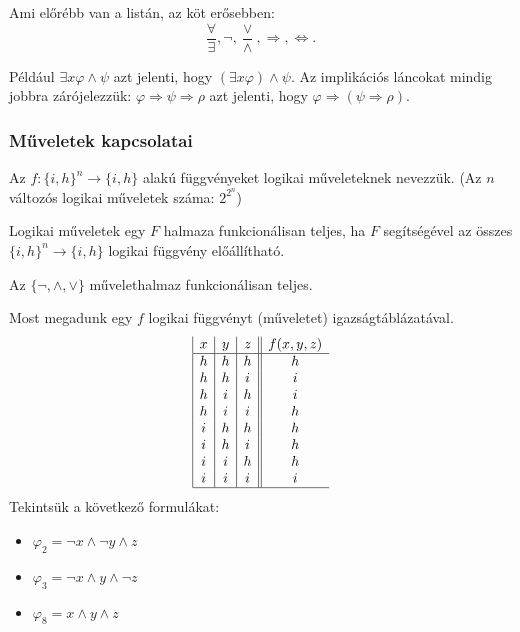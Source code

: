 \begin{defi}[Elősorrend] Ami előrébb van a listán, az köt erősebben: 
$$\frac{\forall}{\exists}, \lnot, \frac{\lor}{\land}, \Rightarrow, \Leftrightarrow.$$
\end{defi}
Például $\exists x \varphi \land \psi$ azt jelenti, hogy $(\exists x \varphi) \land \psi$. Az implikációs láncokat mindig jobbra zárójelezzük: $\varphi \Rightarrow \psi \Rightarrow \rho$ azt jelenti, hogy $\varphi \Rightarrow (\psi \Rightarrow \rho)$.
\subsubsection{Műveletek kapcsolatai}
\begin{defi} Az $f: \lbrace i, h \rbrace^n \rightarrow \lbrace i, h \rbrace$ alakú függvényeket logikai műveleteknek nevezzük. (Az $n$ változós logikai műveletek száma: $2^{2^n}$)
\end{defi}
\begin{defi} Logikai műveletek egy $F$ halmaza funkcionálisan teljes, ha $F$ segítségével az összes $\lbrace i, h \rbrace^n \rightarrow \lbrace i,h \rbrace$ logikai függvény előállítható.
\end{defi}
\begin{theo}
Az $\lbrace \lnot, \land, \lor \rbrace$ művelethalmaz funkcionálisan teljes.
\end{theo}
Most megadunk egy $f$ logikai függvényt (műveletet) igazságtáblázatával.
\begin{displaymath}
\begin{array}{|c|c|c||c}
   x
 & y
 & z
 & f(x,y,z) \\
\hline
h & h & h & h \\
h & h & i & i \\
h & i & h & i \\
h & i & i & h \\
i & h & h & h \\
i & h & i & h \\
i & i & h & h \\
i & i & i & i \\
\hline
\end{array}
\end{displaymath}
Tekintsük a következő formulákat:
\begin{itemize}
\item $\varphi_2 = \lnot x \land \lnot y \land z$
\item $\varphi_3 = \lnot x \land y \land  \lnot z$
\item $\varphi_8 = x \land y \land z$
\end{itemize}
